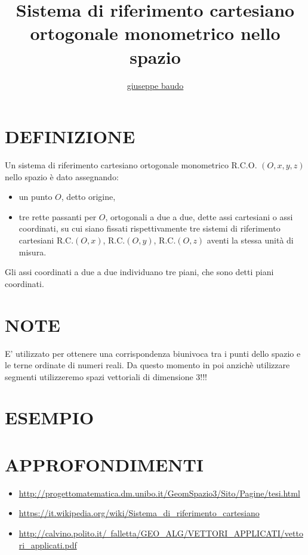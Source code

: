 \documentclass[a4paper,10pt]{article}
\title{Sistema di riferimento cartesiano ortogonale monometrico nello spazio}
\author{\href{http://www.baudo.hol.es}{giuseppe baudo}}
\begin{document}
\maketitle

\section{DEFINIZIONE}
Un sistema di riferimento cartesiano ortogonale monometrico R.C.O. $(O,x,y,z)$ nello spazio è dato assegnando:
\begin{itemize}
 \item un punto $O$, detto origine,
 \item tre rette passanti per $O$, ortogonali a due a due, dette assi cartesiani o assi coordinati, su cui siano fissati rispettivamente tre sistemi di riferimento cartesiani R.C.$(O,x)$, R.C.$(O,y)$, R.C.$(O,z)$ aventi la stessa unità di misura.
\end{itemize}
Gli assi coordinati a due a due individuano tre piani, che sono detti piani coordinati.

\section{NOTE}
E' utilizzato per ottenere una corrispondenza biunivoca tra i punti dello spazio e le terne ordinate di numeri reali. Da questo momento in poi anzichè utilizzare segmenti utilizzeremo spazi vettoriali di dimensione 3!!!

\section{ESEMPIO}

\section{APPROFONDIMENTI}
\begin{itemize}
 \item \href{http://progettomatematica.dm.unibo.it/GeomSpazio3/Sito/Pagine/tesi.html}{http://progettomatematica.dm.unibo.it/GeomSpazio3/Sito/Pagine/tesi.html}
 \item \href{https://it.wikipedia.org/wiki/Sistema_di_riferimento_cartesiano}{https://it.wikipedia.org/wiki/Sistema_di_riferimento_cartesiano}
 \item \href{http://calvino.polito.it/~falletta/GEO_ALG/VETTORI_APPLICATI/vettori_applicati.pdf}{http://calvino.polito.it/~falletta/GEO_ALG/VETTORI_APPLICATI/vettori_applicati.pdf}
\end{itemize}
\end{document}
